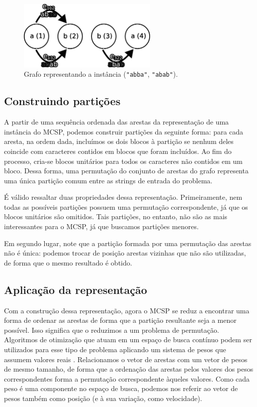 \begin{figure}
    \centering
    \includegraphics[width=0.6\textwidth]{images/grafo.pdf}

    \caption{Grafo representando a instância (\texttt{"abba"}, \texttt{"abab"}).}
    \label{fig:grafo}
\end{figure}

\subsection{Construindo partições}

    A partir de uma sequência ordenada das arestas da representação de uma instância do MCSP, podemos construir partições da seguinte forma: para cada aresta, na ordem dada, incluímos os dois blocos à partição se nenhum deles coincide com caracteres contidos em blocos que foram incluídos. Ao fim do processo, cria-se blocos unitários para todos os caracteres não contidos em um bloco. Dessa forma, uma permutação do conjunto de arestas do grafo representa uma única partição comum entre as strings de entrada do problema.

    É válido ressaltar duas propriedades dessa representação. Primeiramente, nem todas as possíveis partições possuem uma permutação correspondente, já que os blocos unitários são omitidos. Tais partições, no entanto, não são as mais interessantes para o MCSP, já que buscamos partições menores.

    Em segundo lugar, note que a partição formada por uma permutação das arestas não é única: podemos trocar de posição arestas vizinhas que não são utilizadas, de forma que o mesmo resultado é obtido.

\subsection{Aplicação da representação}

    Com a construção dessa representação, agora o MCSP se reduz a encontrar uma forma de ordenar as arestas de forma que a partição resultante seja a menor possível. Isso significa que o reduzimos a um problema de permutação. Algoritmos de otimização que atuam em um espaço de busca contínuo podem ser utilizados para esse tipo de problema aplicando um sistema de pesos que assumem valores reais \cite[p.~661]{marti_handbook_2018}. Relacionamos o vetor de arestas com um vetor de pesos de mesmo tamanho, de forma que a ordenação das arestas pelos valores dos pesos correspondentes forma a permutação correspondente àqueles valores. Como cada peso é uma componente no espaço de busca, podemos nos referir ao vetor de pesos também como posição (e à sua variação, como velocidade).
